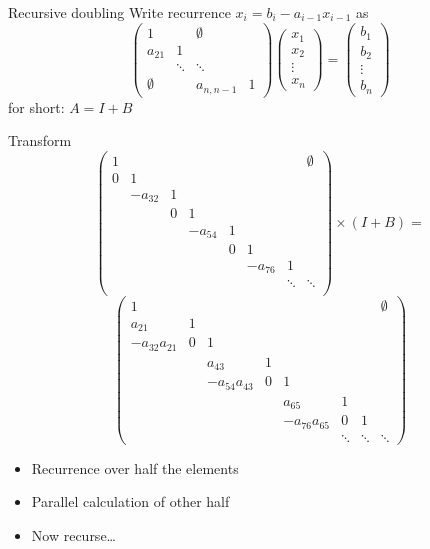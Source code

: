 \begin{frame}{Recursive doubling}
  Write recurrence $x_i=b_i-a_{i-1}x_{i-1}$
  as
\[ 
  \begin{pmatrix}
    1&&\emptyset\\ a_{21}&1\\ &\ddots&\ddots\\ 
    \emptyset&&a_{n,n-1}&1
  \end{pmatrix}
  \begin{pmatrix}
    x_1\\ x_2\\ \vdots \\ x_n
  \end{pmatrix}
  =
  \begin{pmatrix}
    b_1\\ b_2\\ \vdots \\ b_n
  \end{pmatrix}
\]
for short: $A=I+B$
\end{frame}

\begin{frame}
Transform
\tiny
\[
  \begin{pmatrix}
    1&&&&&&&\emptyset\\ 0&1\\ &-a_{32}&1\\ &&0&1\\
    &&&-a_{54}&1\\ &&&&0&1\\ &&&&&-a_{76}&1\\ &&&&&&\ddots&\ddots\\
  \end{pmatrix}\times (I+B) =
\] \[
  \begin{pmatrix}
    1&&&&&&&\emptyset\\ a_{21}&1\\ -a_{32}a_{21}&0&1\\ 
    &&a_{43}&1\\ &&-a_{54}a_{43}&0&1\\
    &&&&a_{65}&1\\ &&&&-a_{76}a_{65}&0&1\\ &&&&&\ddots&\ddots&\ddots
  \end{pmatrix}
\]
\begin{itemize}
\item Recurrence over half the elements
\item Parallel calculation of other half
\item Now recurse\ldots
\end{itemize}
\end{frame}



